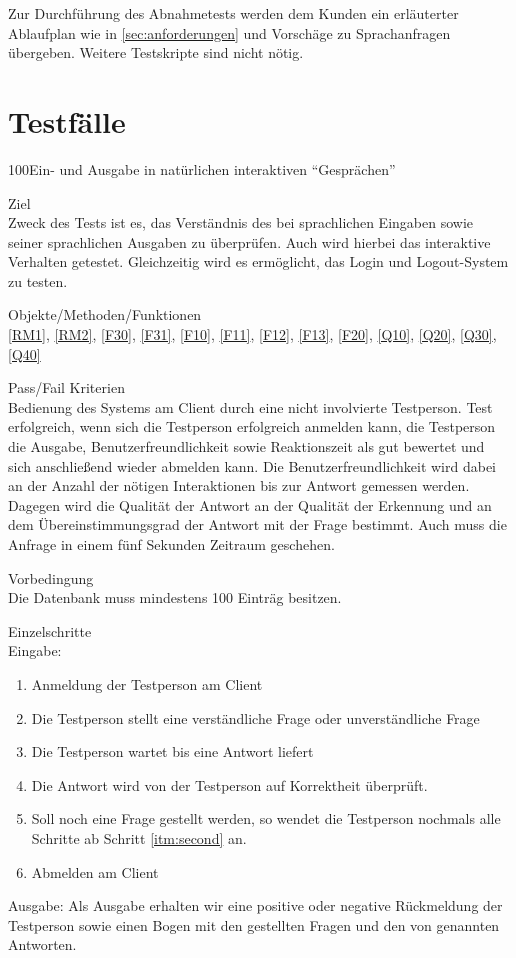Zur Durchführung des Abnahmetests werden dem Kunden ein erläuterter Ablaufplan wie in \ref{sec:anforderungen} und Vorschäge zu Sprachanfragen übergeben.
Weitere Testskripte sind nicht nötig.

\section{Testfälle}

\begin{testcase}{100}{Ein- und Ausgabe in natürlichen interaktiven
"`Gesprächen"'}

\item[Ziel]~\\
Zweck des Tests ist es, das Verständnis des \NewsGenies bei sprachlichen
Eingaben sowie seiner sprachlichen Ausgaben zu überprüfen. Auch wird hierbei
das interaktive Verhalten getestet. Gleichzeitig wird es ermöglicht, das Login
und Logout-System zu testen.

\item[Objekte/Methoden/Funktionen]~\\
\ref{RM1}, \ref{RM2}, \ref{F30}, \ref{F31}, \ref{F10}, \ref{F11},
\ref{F12}, \ref{F13}, \ref{F20}, \ref{Q10}, \ref{Q20}, \ref{Q30}, \ref{Q40}

\item[Pass/Fail Kriterien]~\\
Bedienung des Systems am Client durch eine nicht involvierte Testperson.
Test erfolgreich, wenn sich die Testperson erfolgreich anmelden kann, die
Testperson die Ausgabe, Benutzerfreundlichkeit
sowie Reaktionszeit als gut
bewertet und sich anschließend wieder abmelden kann. Die Benutzerfreundlichkeit
wird dabei an der Anzahl der nötigen Interaktionen bis zur Antwort gemessen
werden. Dagegen wird die Qualität der Antwort an der Qualität der Erkennung und
an dem Übereinstimmungsgrad der Antwort mit der Frage bestimmt. Auch muss die
Anfrage in einem fünf Sekunden Zeitraum geschehen.

\item[Vorbedingung]~\\
Die Datenbank muss mindestens 100 Einträg besitzen.

\item[Einzelschritte]~\\
Eingabe:
\begin{enumerate}
\item Anmeldung der Testperson am Client
\item \label{itm:second} Die Testperson stellt \NewsGenie eine verständliche
Frage oder unverständliche Frage
\item Die Testperson wartet bis \NewsGenie eine Antwort liefert
\item Die Antwort wird von der Testperson auf Korrektheit überprüft.
\item Soll noch eine Frage gestellt werden, so wendet die Testperson nochmals
alle Schritte ab Schritt \ref{itm:second} an.
\item Abmelden am Client
\end{enumerate}
Ausgabe:
Als Ausgabe erhalten wir eine positive oder negative Rückmeldung der Testperson
sowie einen Bogen mit den gestellten Fragen und den von \NewsGenie genannten
Antworten.


\end{testcase}
